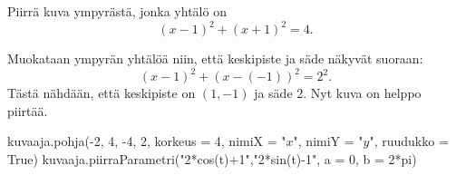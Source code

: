 

\begin{esimerkki}
Piirrä kuva ympyrästä, jonka yhtälö on
\[
(x-1)^2+(x+1)^2=4.
\]
\begin{esimratk}
Muokataan ympyrän yhtälöä niin, että keskipiste ja säde näkyvät suoraan:
\[
(x-1)^2+(x-(-1))^2=2^2.
\]
Tästä nähdään, että keskipiste on $(1, -1)$ ja säde 2. Nyt kuva on helppo piirtää.

\begin{kuva}
    kuvaaja.pohja(-2, 4, -4, 2, korkeus = 4, nimiX = "$x$", nimiY = "$y$", ruudukko = True)
    kuvaaja.piirraParametri("2*cos(t)+1","2*sin(t)-1", a = 0, b = 2*pi)
\end{kuva}

\end{esimratk}
\end{esimerkki}





